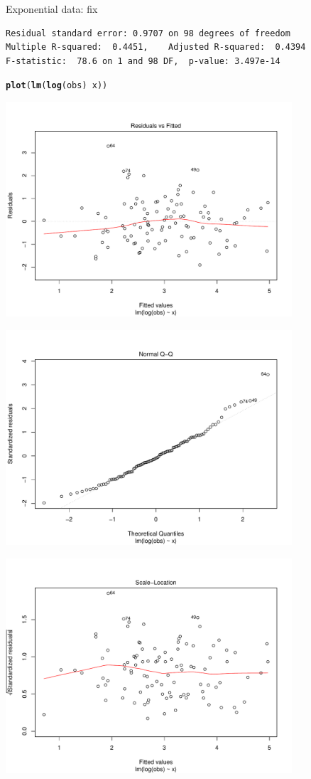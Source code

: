 \documentclass[10pt]{beamer}\usepackage[]{graphicx}\usepackage[]{color}
\makeatletter
\newcommand{\hlopt}[1]{\textcolor[rgb]{0,0,0}{#1}}%
\newcommand{\hlstd}[1]{\textcolor[rgb]{0.345,0.345,0.345}{#1}}%
\newcommand{\hlkwd}[1]{\textcolor[rgb]{0.737,0.353,0.396}{\textbf{#1}}}%
\newenvironment{kframe}{%
 \def\at@end@of@kframe{}%
 \ifinner\ifhmode%
  \def\at@end@of@kframe{\end{minipage}}%
  \begin{minipage}{\columnwidth}%
 \fi\fi%
 \def\FrameCommand##1{\hskip\@totalleftmargin \hskip-\fboxsep
 \colorbox{shadecolor}{##1}\hskip-\fboxsep
     \hskip-\linewidth \hskip-\@totalleftmargin \hskip\columnwidth}%
 \MakeFramed {\advance\hsize-\width
   \@totalleftmargin\z@ \linewidth\hsize
   \@setminipage}}%
 {\par\unskip\endMakeFramed%
 \at@end@of@kframe}
\newenvironment{knitrout}{}{} %
\makeatother
\begin{document}
\begin{frame}[fragile]{Exponential data: fix}
\begin{knitrout}
\begin{kframe}
\begin{verbatim}
Residual standard error: 0.9707 on 98 degrees of freedom
Multiple R-squared:  0.4451,	Adjusted R-squared:  0.4394 
F-statistic:  78.6 on 1 and 98 DF,  p-value: 3.497e-14
\end{verbatim}
\begin{alltt}
\hlkwd{plot}\hlstd{(}\hlkwd{lm}\hlstd{(}\hlkwd{log}\hlstd{(obs)} \hlopt{~} \hlstd{x))}
\end{alltt}
\end{kframe}
\includegraphics[width=0.8\textwidth,height=0.6\textwidth]{figure/unnamed-chunk-25-2} 

\includegraphics[width=0.8\textwidth,height=0.6\textwidth]{figure/unnamed-chunk-25-3} 

\includegraphics[width=0.8\textwidth,height=0.6\textwidth]{figure/unnamed-chunk-25-4} 


\end{knitrout}
\end{frame}
\end{document}
